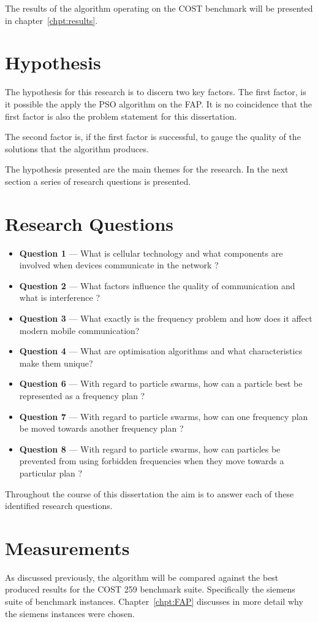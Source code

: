The results of the algorithm operating on the \gls{COST} benchmark will be presented in chapter~\ref{chpt:results}. 
\section{Hypothesis}
The hypothesis for this research is to discern two key factors. The first factor, is it possible the apply the \gls{PSO} algorithm on the \gls{FAP}. It is no coincidence that the first factor is also the problem statement for this dissertation.

The second factor is, if the first factor is successful, to gauge the quality of the solutions that the algorithm produces.

The hypothesis presented are the main themes for the research. In the next section a series of research questions is presented.
\section{Research Questions}
\begin{itemize}
\item \textbf{Question 1} --- What is cellular technology and what components are involved when devices communicate in the network ?
\item \textbf{Question 2} --- What factors influence the quality of communication and what is interference ?
\item \textbf{Question 3} --- What exactly is the frequency problem and how does it affect modern mobile communication?
\item \textbf{Question 4} --- What are optimisation algorithms and what characteristics make them unique?
\item \textbf{Question 6} --- With regard to particle swarms, how can a particle best be represented as a frequency plan ?
\item \textbf{Question 7} --- With regard to particle swarms, how can one frequency plan be moved towards another frequency plan ?
\item \textbf{Question 8} --- With regard to particle swarms, how can particles be prevented from using forbidden frequencies when they move towards a particular plan ?
\end{itemize}

Throughout the course of this dissertation the aim is to answer each of these identified research questions. 

\section{Measurements}
As discussed previously, the algorithm will be compared against the best produced results for the \gls{COST} 259 benchmark suite. Specifically the siemens suite of benchmark instances. Chapter~\ref{chpt:FAP} discusses in more detail why the siemens instances were chosen.

